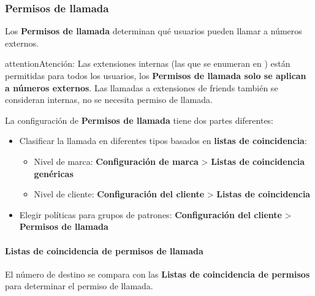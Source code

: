 \documentclass[letterpaper,10pt,spanish]{sphinxmanual}
\begin{document}
\subsubsection{Permisos de llamada}
\label{administration_portal/client/vpbx/user_configuration/call_acls:call-permissions}\label{administration_portal/client/vpbx/user_configuration/call_acls::doc}\label{administration_portal/client/vpbx/user_configuration/call_acls:call-acls}
Los \textbf{Permisos de llamada} determinan qué usuarios pueden llamar a números externos.

\begin{notice}{attention}{Atención:}
Las extensiones internas (las que se enumeran en {\hyperref[administration_portal/client/vpbx/extensions:extensions]{}}) están permitidas para todos los usuarios, los \textbf{Permisos de llamada solo se aplican a números externos}. Las llamadas a extensiones de friends también se consideran internas, no se necesita permiso de llamada.
\end{notice}

La configuración de \textbf{Permisos de llamada} tiene dos partes diferentes:
\begin{itemize}
\item {} 
Clasificar la llamada en diferentes tipos basados en \textbf{listas de coincidencia}:
\begin{itemize}
\item {} 
Nivel de marca: \textbf{Configuración de marca} \textgreater{} \textbf{Listas de coincidencia genéricas}

\item {} 
Nivel de cliente: \textbf{Configuración del cliente} \textgreater{} \textbf{Listas de coincidencia}

\end{itemize}

\item {} 
Elegir políticas para grupos de patrones: \textbf{Configuración del cliente} \textgreater{} \textbf{Permisos de llamada}

\end{itemize}


\paragraph{Listas de coincidencia de permisos de llamada}
\label{administration_portal/client/vpbx/user_configuration/call_acls:call-acl-matchlists}
El número de destino se compara con las \textbf{Listas de coincidencia de permisos} para determinar el permiso de llamada.
\end{document}
